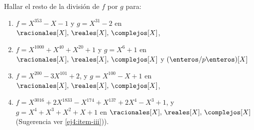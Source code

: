 \begin{enunciado}{\ejercicio}

  Hallar el resto de la división de $f$ por $g$ para:

  \begin{enumerate}[label=\roman*)]
    \item $f = X^{353} - X - 1$ y $g = X^{31} - 2$ en $\racionales[X],\,\reales[X],\,\complejos[X]$,

    \item $f = X^{1000} + X^{40} + X^{20}  + 1$ y $g = X^6 + 1$ en $\racionales[X],\,\reales[X],\,\complejos[X]$ y $(\enteros/p\enteros)[X]$

    \item $f = X^{200} - 3X^{101} + 2$, y $g = X^{100} - X + 1$ en $\racionales[X],\,\reales[X],\,\complejos[X]$,

    \item $f = X^{3016} + 2X^{1833} - X^{174} + X^{137} + 2X^4 - X^3 + 1$, y $g = X^4 + X^3 +X^2 + X + 1$ en $\racionales[X],\,\reales[X],\,\complejos[X]$
          (Sugerencia ver  \ref{ej4:item-iii})).
  \end{enumerate}

\end{enunciado}

